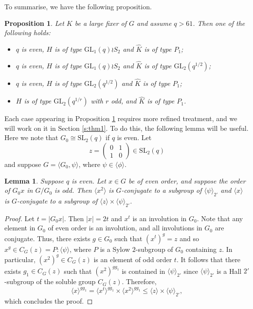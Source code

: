 \documentclass[twoside,a4paper,reqno,11pt]{amsart}
\newcommand{\<}{\langle}
\renewcommand{\>}{\rangle}
\newcommand{\la}{\langle}
\newcommand{\ra}{\rangle}
\newcommand{\leqs}{\leqslant}
\newcommand{\GL}{\mathrm{GL}}
\newcommand{\SL}{\mathrm{SL}}
\newtheorem{prop}[thm]{Proposition}
\newtheorem{lem}[thm]{Lemma}
\theoremstyle{definition}
\begin{document}
	
	
	
	To summarise, we have the following proposition.
	
	\begin{prop}
		\label{p:PSL2_summarise}
		Let $K$ be a large fixer of $G$ and assume $q>61$. Then one of the following holds:
		\begin{itemize}\addtolength{\itemsep}{0.2\baselineskip}
			\item[{\rm (a)}] $q$ is even, $H$ is of type $\GL_1(q)\wr S_2$ and $\widehat{K}$ is of type $P_1$;
			\item[{\rm (b)}] $q$ is even, $H$ is of type $\GL_1(q)\wr S_2$ and $\widehat{K}$ is of type $\GL_2(q^{1/2})$;
			\item[{\rm (c)}] $q$ is even, $H$ is of type $\GL_2(q^{1/2})$ and $\widehat{K}$ is of type $P_1$;
			\item[{\rm (d)}] $H$ is of type $\GL_2(q^{1/r})$ with $r$ odd, and $\widehat{K}$ is of type $P_1$.
		\end{itemize}
	\end{prop}
	
	Each case appearing in Proposition \ref{p:PSL2_summarise} requires more refined treatment, and we will work on it in Section \ref{s:thm1}. To do this, the following lemma will be useful. Here we note that $G_0\cong \SL_2(q)$ if $q$ is even. Let
	\begin{equation}
	\label{e:SL_invo}
	z =
	\begin{pmatrix}
	0&1\\
	1&0
	\end{pmatrix}\in \SL_2(q)
	\end{equation}
	and suppose $G = \la G_0,\psi\ra$, where $\psi\in\la\phi\ra$.
	
	\begin{lem}
		\label{l:PSL2_even_conju}
		Suppose $q$ is even. Let $x\in G$ be of even order, and suppose the order of $G_0x$ in $G/G_0$ is odd. Then $\la x^2\ra$ is $G$-conjugate to a subgroup of $\la\psi\ra_{2'}$ and $\la x\ra$ is $G$-conjugate to a subgroup of $\la z\ra\times \la\psi\ra_{2'}$.
	\end{lem}
	
	\begin{proof}
		Let $t = |G_0x|$. Then $|x| = 2t$ and $x^t$ is an involution in $G_0$. Note that any element in $G_0$ of even order is an involution, and all involutions in $G_0$ are conjugate. Thus, there exists $g\in G_0$ such that $(x^t)^g = z$ and so $x^g\in C_G(z) = P{:}\la\psi\ra$, where $P$ is a Sylow $2$-subgroup of $G_0$ containing $z$. In particular, $(x^2)^g\in C_G(z)$ is an element of odd order $t$. It follows that there exists $g_1\in C_G(z)$ such that $(x^2)^{gg_1}$ is contained in $\la\psi\ra_{2'}$ since $\la\psi\ra_{2'}$ is a Hall $2'$-subgroup of the soluble group $C_G(z)$. Therefore,
		\begin{equation*}
		\la x\ra^{gg_1} = \la x^t\ra^{gg_1} \times \la x^2\ra^{gg_1} \leqs \la z\ra \times \la\psi\ra_{2'},
		\end{equation*}
		which concludes the proof.
	\end{proof}
	
\end{document}
